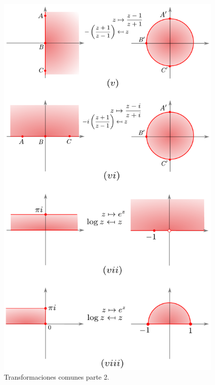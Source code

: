 \begin{figure}[H]
    \centering
    \includegraphics[scale = 0.7]{Figuras/MapeoConforme5.pdf}
    \caption{Transformaciones comunes parte 2.}
    \label{fig:EjMapeosConformes2}
\end{figure}

